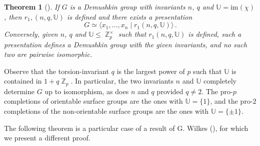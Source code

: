 \documentclass[a4paper]{amsart}
\DeclareMathOperator{\bbz}{\mathbb{Z}}
\newtheorem{thm}{Theorem}[section]
\theoremstyle{definition}
\begin{document}
\begin{thm}[{\cite{labuteClassificationDemushkinGroups1967}}]\label{thm-classification} If \(G\) is a Demushkin group with invariants \(n\), \(q\) and \(\mathbb{U} = \mathrm{im}(\chi)\), then \(r_1,(n,q,\mathbb{U})\) is defined and there exists a presentation \[G \simeq \langle x_1,\ldots,x_n \mid r_1(n,q,\mathbb{U})\rangle\,.\] Conversely, given \(n\), \(q\) and \(\mathbb{U} \leq \bbz_p^\times\) such that \(r_1(n,q,\mathbb{U})\) is defined, such a presentation defines a Demushkin group with the given invariants, and no such two are pairwise isomorphic.
\end{thm}

Observe that the torsion-invariant \(q\) is the largest power of \(p\) such that \(\mathbb{U}\) is contained in \(1+q\bbz_p\). In particular, the two invariants \(n\) and \(\mathbb{U}\) completely determine \(G\) up to isomorphism, as does \(n\) and \(q\) provided \(q \neq 2\). The pro-\(p\) completions of orientable surface groups are the ones with \(\mathbb{U} = \{1\}\), and the pro-\(2\) completions of the non-orientable surface groups are the ones with \(\mathbb{U} =  \{\pm 1\}\).

The following theorem is a particular case of a result of G. Wilkes (\cite{wilkesRelativeCohomologyTheory2019}), for which we present a different proof.
\end{document}
